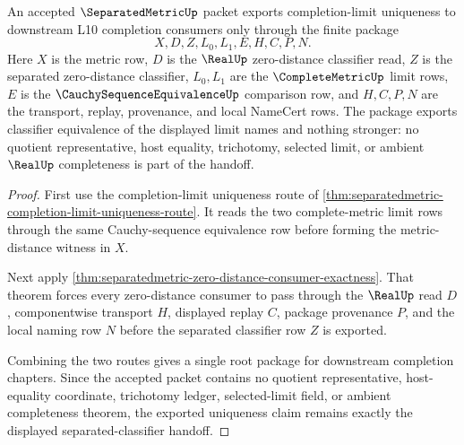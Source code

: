\begin{theorem}
\label{thm:separatedmetric-cauchy-uniqueness-root-package}
An accepted $\SeparatedMetricUp$ packet exports completion-limit uniqueness to downstream L10 completion consumers only through the finite package
$$
X,D,Z,L_0,L_1,E,H,C,P,N .
$$
Here $X$ is the metric row, $D$ is the $\RealUp$ zero-distance classifier read, $Z$ is the separated zero-distance classifier, $L_0,L_1$ are the $\CompleteMetricUp$ limit rows, $E$ is the $\CauchySequenceEquivalenceUp$ comparison row, and $H,C,P,N$ are the transport, replay, provenance, and local NameCert rows. The package exports classifier equivalence of the displayed limit names and nothing stronger: no quotient representative, host equality, trichotomy, selected limit, or ambient $\RealUp$ completeness is part of the handoff.
\end{theorem}
\begin{proof}
First use the completion-limit uniqueness route of \autoref{thm:separatedmetric-completion-limit-uniqueness-route}. It reads the two complete-metric limit rows through the same Cauchy-sequence equivalence row before forming the metric-distance witness in $X$.

Next apply \autoref{thm:separatedmetric-zero-distance-consumer-exactness}. That theorem forces every zero-distance consumer to pass through the $\RealUp$ read $D$, componentwise transport $H$, displayed replay $C$, package provenance $P$, and the local naming row $N$ before the separated classifier row $Z$ is exported.

Combining the two routes gives a single root package for downstream completion chapters. Since the accepted packet contains no quotient representative, host-equality coordinate, trichotomy ledger, selected-limit field, or ambient completeness theorem, the exported uniqueness claim remains exactly the displayed separated-classifier handoff.
\end{proof}

